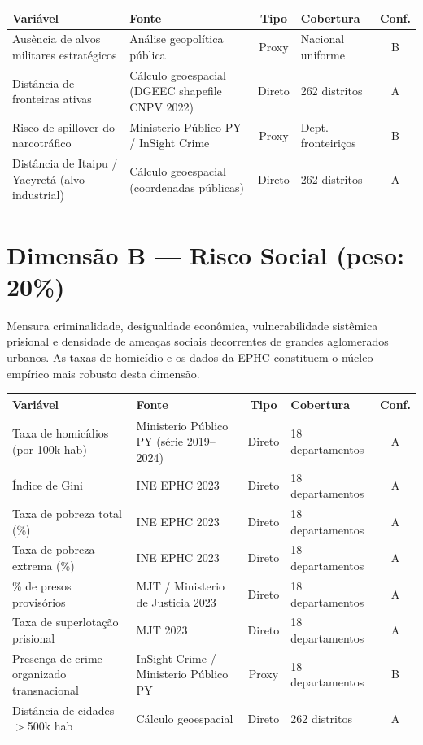 \medskip
{\small\renewcommand{\arraystretch}{1.3}
\begin{tabular}{@{}p{3.2cm} p{3.5cm} c p{2.2cm} c@{}}
\toprule
\textbf{Variável} & \textbf{Fonte} & \textbf{Tipo} & \textbf{Cobertura} & \textbf{Conf.} \\
\midrule
Ausência de alvos militares estratégicos &
  Análise geopolítica pública &
  Proxy &
  Nacional uniforme &
  B \\
\midrule
Distância de fronteiras ativas &
  Cálculo geoespacial (DGEEC shapefile CNPV 2022) &
  Direto &
  262 distritos &
  A \\
\midrule
Risco de spillover do narcotráfico &
  Ministerio Público PY / InSight Crime &
  Proxy &
  Dept. fronteiriços &
  B \\
\midrule
Distância de Itaipu / Yacyretá (alvo industrial) &
  Cálculo geoespacial (coordenadas públicas) &
  Direto &
  262 distritos &
  A \\
\bottomrule
\end{tabular}%
}

\section*{Dimensão B — Risco Social (peso: 20\%)}
\label{apendice:variaveis:dimB}

Mensura criminalidade, desigualdade econômica, vulnerabilidade sistêmica
prisional e densidade de ameaças sociais decorrentes de grandes aglomerados
urbanos. As taxas de homicídio e os dados da EPHC constituem o núcleo
empírico mais robusto desta dimensão.

\medskip
{\small\renewcommand{\arraystretch}{1.3}
\begin{tabular}{@{}p{3.2cm} p{3.5cm} c p{2.2cm} c@{}}
\toprule
\textbf{Variável} & \textbf{Fonte} & \textbf{Tipo} & \textbf{Cobertura} & \textbf{Conf.} \\
\midrule
Taxa de homicídios (por 100k hab) &
  Ministerio Público PY (série 2019--2024) &
  Direto &
  18 departamentos &
  A \\
\midrule
Índice de Gini &
  INE EPHC 2023 &
  Direto &
  18 departamentos &
  A \\
\midrule
Taxa de pobreza total (\%) &
  INE EPHC 2023 &
  Direto &
  18 departamentos &
  A \\
\midrule
Taxa de pobreza extrema (\%) &
  INE EPHC 2023 &
  Direto &
  18 departamentos &
  A \\
\midrule
\% de presos provisórios &
  MJT / Ministerio de Justicia 2023 &
  Direto &
  18 departamentos &
  A \\
\midrule
Taxa de superlotação prisional &
  MJT 2023 &
  Direto &
  18 departamentos &
  A \\
\midrule
Presença de crime organizado transnacional &
  InSight Crime / Ministerio Público PY &
  Proxy &
  18 departamentos &
  B \\
\midrule
Distância de cidades $>$500k hab &
  Cálculo geoespacial &
  Direto &
  262 distritos &
  A \\
\bottomrule
\end{tabular}%
}

